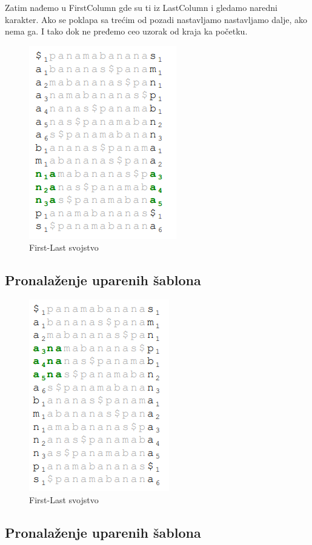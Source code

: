 Zatim nađemo u FirstColumn gde su ti iz LastColumn i gledamo naredni karakter. Ako se poklapa sa trećim od pozadi nastavljamo nastavljamo dalje, ako nema ga. I tako dok ne pređemo ceo uzorak od kraja ka početku.

\begin{figure}[h!]
\centering
\includegraphics[scale=0.5]{poglavlja/9/slike/traziAnukraj1.png}
\caption{First-Last svojstvo}
\label{slika:X}
\end{figure}
\subsection{Pronalaženje uparenih šablona}


\begin{figure}[h!]
\centering
\includegraphics[scale=0.5]{poglavlja/9/slike/traziAnukraj2.png}
\caption{First-Last svojstvo}
\label{slika:X}
\end{figure}
\subsection{Pronalaženje uparenih šablona}

